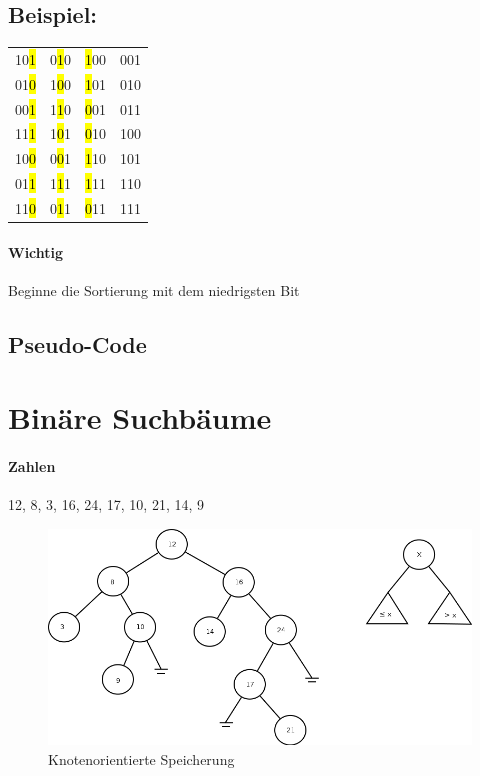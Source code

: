 \subsection{Beispiel:}
\begin{tabular}{l l l l}
  10\hl{1} & 0\hl{1}0 & \hl{1}00 & 001 \\
  01\hl{0} & 1\hl{0}0 & \hl{1}01 & 010\\
  00\hl{1} & 1\hl{1}0 & \hl{0}01 & 011 \\
  11\hl{1} & 1\hl{0}1 & \hl{0}10 & 100 \\
  10\hl{0} & 0\hl{0}1 & \hl{1}10 & 101 \\
  01\hl{1} & 1\hl{1}1 & \hl{1}11 & 110 \\
  11\hl{0} & 0\hl{1}1 & \hl{0}11 & 111 \\
\end{tabular}
\paragraph{Wichtig}Beginne die Sortierung mit dem niedrigsten Bit

\subsection{Pseudo-Code}



\pagebreak

\section{Binäre Suchbäume}

\paragraph{Zahlen} 12, 8, 3, 16, 24, 17, 10, 21, 14, 9 

\begin{figure}[H]
\includegraphics[width=\linewidth]{9/Grafik/img3.png}
\captionsetup{justification=raggedright, singlelinecheck=false}
\caption{Knotenorientierte Speicherung}
\end{figure}
